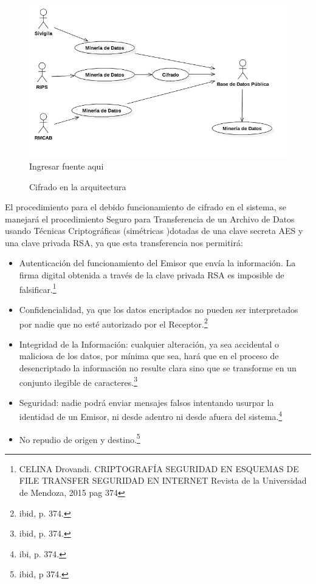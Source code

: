 \documentclass[a4paper,openright,12pt]{book}
\theoremstyle{definition}
\theoremstyle{remark}
\begin{document}
\begin{figure}[htb]
\centering
\caption{Cifrado en la arquitectura} 
\includegraphics[scale=0.4]{Diagrama_Arq}
\label{fig:Cifrado}
\\Ingresar fuente aqui
\end{figure}

El procedimiento para el debido funcionamiento de cifrado en el sistema, se manejará el procedimiento Seguro para Transferencia de un Archivo de Datos usando Técnicas Criptográficas (simétricas )dotadas de una clave secreta AES y una clave privada RSA, ya que esta transferencia nos permitirá:

\begin{itemize}
\item Autenticación del funcionamiento del Emisor que envía la información. La firma digital obtenida a través de la clave privada RSA es imposible de falsificar.\footnote{CELINA Drovandi. CRIPTOGRAFÍA
SEGURIDAD EN ESQUEMAS DE FILE TRANSFER SEGURIDAD EN INTERNET Revista de la Universidad de Mendoza, 2015 pag 374}
\item Confidencialidad, ya que los datos encriptados no pueden ser interpretados por nadie que no esté autorizado por el Receptor.\footnote{ibid, p. 374.}
\item Integridad de la Información: cualquier alteración, ya sea accidental o maliciosa de los datos, por mínima que sea, hará que en el proceso de desencriptado la información no resulte clara sino que se transforme en un conjunto ilegible de caracteres.\footnote{ibid, p. 374.}
\item Seguridad: nadie podrá enviar mensajes falsos intentando usurpar la identidad de un Emisor, ni desde adentro ni desde afuera del sistema.\footnote{ibi, p. 374.}
\item No repudio de origen y destino.\footnote{ibid, p 374.}
\end{itemize}
\end{document}
